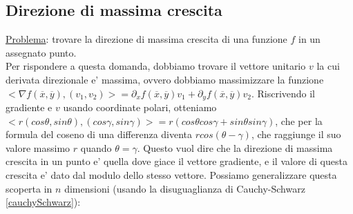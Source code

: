 \documentclass{report}
\begin{document}
\subsection{Direzione di massima crescita}
\underline{Problema}: trovare la direzione di massima crescita di una funzione $ f $ in un assegnato punto.\\
Per rispondere a questa domanda, dobbiamo trovare il vettore unitario $ v $ la cui derivata direzionale e' massima, ovvero dobbiamo massimizzare la funzione $ <\nabla f(\overline{x}, \overline{y}), (v_1,v_2)> = \partial_x f(\overline{x}, \overline{y}) v_1 + \partial_yf(\overline{x}, \overline{y}) v_2 $. Riscrivendo il gradiente e $ v $ usando coordinate polari, otteniamo $ <r(cos\theta, sin\theta), (cos\gamma, sin\gamma)> = r(cos\theta cos\gamma+sin\theta sin\gamma) $, che per la formula del coseno di una differenza diventa $ rcos(\theta - \gamma) $, che raggiunge il suo valore massimo $ r $ quando $ \theta = \gamma $. Questo vuol dire che la direzione di massima crescita in un punto e' quella dove giace il vettore gradiente, e il valore di questa crescita e' dato dal modulo dello stesso vettore. Possiamo generalizzare questa scoperta in $ n $ dimensioni (usando la disuguaglianza di Cauchy-Schwarz \ref{cauchySchwarz}):
\end{document}
